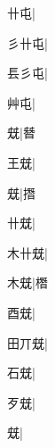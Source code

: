 \begin{multicols}{2}
{{卄屯}\mktsJzrVerticalBar{}{\cjk{}{\cnsym{}　}{\cnsym{}　}{\cnsym{}　}}|{}\par
{\cjk{}彡卄屯}|{}\par
{\cjk{}镸彡屯}\mktsJzrVerticalBar{}{\cjk{}{\cnsym{}　}{\cnsym{}　}{\cnsym{}　}}|{}\par
{艸屯}\mktsJzrVerticalBar{}{\cjk{}{\cnsym{}　}{\cnsym{}　}{\cnsym{}　}}|{}\par
{\cjk{}{\cnsym{}　}{\cnsym{}　}兓}\mktsJzrVerticalBar{}{\cjk{}{\cnsym{}　}{\cnsym{}　}{\cnsym{}　}}|{\cjk{}朁}\par
{\cjk{}{\cnsym{}　}王兓}\mktsJzrVerticalBar{}{\cjk{}{\cnsym{}　}{\cnsym{}　}{\cnsym{}　}}|{}\par
{兓}\mktsJzrVerticalBar{}{\cjk{}{\cnsym{}　}{\cnsym{}　}{\cnsym{}　}}|{\cjk{}撍}\par
{\cjk{}{\cnsym{}　}卄兓}\mktsJzrVerticalBar{}{\cjk{}{\cnsym{}　}{\cnsym{}　}{\cnsym{}　}}|{}\par
{\cjk{}木卄兓}\mktsJzrVerticalBar{}{\cjk{}{\cnsym{}　}{\cnsym{}　}{\cnsym{}　}}|{}\par
{\cjk{}{\cnsym{}　}木兓}\mktsJzrVerticalBar{}{\cjk{}{\cnsym{}　}{\cnsym{}　}{\cnsym{}　}}|{\cjk{}橬}\par
{\cjk{}{\cnsym{}　}酉兓}\mktsJzrVerticalBar{}{\cjk{}{\cnsym{}　}{\cnsym{}　}{\cnsym{}　}}|{}\par
{\cjk{}田丌兓}|{}\par
{\cjk{}{\cnsym{}　}石兓}\mktsJzrVerticalBar{}{\cjk{}{\cnsym{}　}{\cnsym{}　}{\cnsym{}　}}|{}\par
{\cjk{}{\cnsym{}　}歹兓}\mktsJzrVerticalBar{}{\cjk{}{\cnsym{}　}{\cnsym{}　}{\cnsym{}　}}|{}\par
{兓}\mktsJzrVerticalBar{}{\cjk{}{\cnsym{}　}{\cnsym{}　}{\cnsym{}　}}|{}\par
}
\end{multicols}
